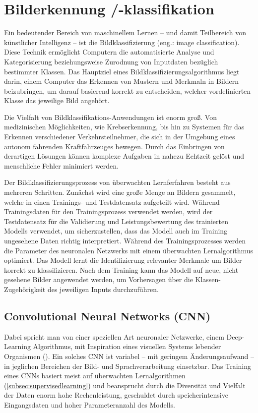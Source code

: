 \section{Bilderkennung /-klassifikation} \label{chpt:Stand_der_Technik_Bilderkennung}
Ein bedeutender Bereich von maschinellem Lernen -- und damit Teilbereich von künstlicher Intelligenz -- ist die Bildklassifizierung (eng.: image classification). Diese Technik ermöglicht Computern die automatisierte Analyse und Kategorisierung beziehungsweise Zurodnung von Inputdaten bezüglich bestimmter Klassen. Das Hauptziel eines Bildklassifizierungsalgorithmus liegt darin, einem Computer das Erkennen von Mustern und Merkmaln in Bildern beizubringen, um darauf basierend korrekt zu entscheiden, welcher vordefinierten Klasse das jeweilige Bild angehört.

Die Vielfalt von Bildklassifikations-Anwendungen ist enorm groß. Von medizinischen Möglichkeiten, wie Krebserkennung, bis hin zu Systemen für das Erkennen verschiedener Verkehrsteilnehmer, die sich in der Umgebung eines autonom fahrenden Kraftfahrzeuges bewegen. Durch das Einbringen von derartigen Lösungen können komplexe Aufgaben in nahezu Echtzeit gelöst und menschliche Fehler minimiert werden.

Der Bildklassifizierungsprozess von überwachten Lernferfahren besteht aus mehreren Schritten. Zunächst wird eine große Menge an Bildern gesammelt, welche in einen Trainings- und Testdatensatz aufgeteilt wird. Während Trainingsdaten für den Trainingsprozess verwendet werden, wird der Testdatensatz für die Validierung und Leistungsbewertung des trainierten Modells verwendet, um sicherzustellen, dass das Modell auch im Training ungesehene Daten richtig interpretiert. Während des Trainingsprozesses werden die Parameter des neuronalen Netzwerks mit einem überwachten Lernalgorithmus optimiert. Das Modell lernt die Identifizierung relevanter Merkmale um Bilder korrekt zu klassifizieren. Nach dem Training kann das Modell auf neue, nicht gesehene Bilder angewendet werden, um Vorhersagen über die Klassen-Zugehörigkeit des jeweiligen Inputs durchzuführen.

\subsection{Convolutional Neural Networks (CNN)}
Dabei spricht man von einer speziellen Art neuronaler Netzwerke, einem Deep-Learning Algorithmus, mit Inspiration eines visuellen Systems lebender Organismen (\cite[519]{balas_recent_2020}). Ein solches CNN ist variabel -- mit geringem Änderungsaufwand -- in jeglichen Bereichen der Bild- und Sprachverarbeitung einsetzbar. Das Training eines CNNs basiert meist auf überwachten Lernalgorithmen  (\ref{subsec:supervisedlearning}) und beansprucht durch die Diversität und Vielfalt der Daten enorm hohe Rechenleistung, geschuldet durch speicherintensive Eingangsdaten und hoher Parameteranzahl des Modells.

